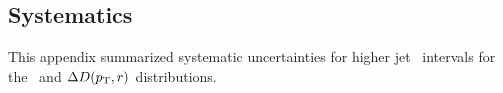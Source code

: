 
\subsection{Systematics}
\label{subsec:SystematicApp}

This appendix summarized systematic uncertainties for higher jet \pT\ intervals for the \Dptr\ and $\Delta\mbox{$D( p_{\mathrm{T}}, r)$}$ distributions.
 
 \begin{figure}
\end{figure}

